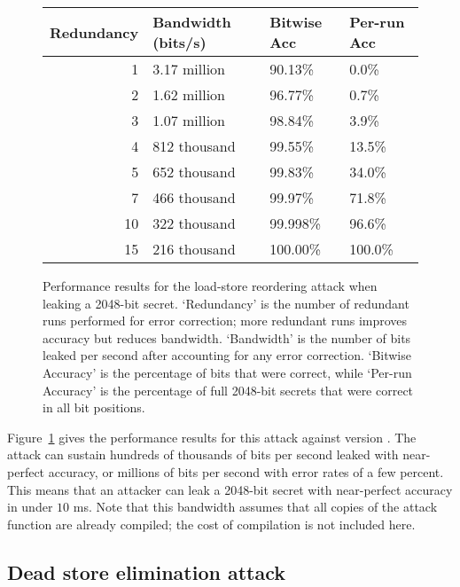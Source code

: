 \begin{figure}
  \small
  \begin{tabular}{ r | l | l | l }
    Redundancy & Bandwidth (bits/s) & Bitwise Acc & Per-run Acc \\ \hline
    1          & 3.17 million       & 90.13\%     & 0.0\%       \\
    2          & 1.62 million       & 96.77\%     & 0.7\%       \\
    3          & 1.07 million       & 98.84\%     & 3.9\%       \\
    4          & 812 thousand       & 99.55\%     & 13.5\%      \\
    5          & 652 thousand       & 99.83\%     & 34.0\%      \\
    7          & 466 thousand       & 99.97\%     & 71.8\%      \\
    10         & 322 thousand       & 99.998\%    & 96.6\%      \\
    15         & 216 thousand       & 100.00\%    & 100.0\%     \\
  \end{tabular}
  \caption{
    Performance results for the load-store reordering attack when leaking a
    2048-bit secret.
    `Redundancy' is the number of redundant runs performed for error
    correction; more redundant runs improves accuracy but reduces bandwidth.
    `Bandwidth' is the number of bits leaked per second after accounting for
    any error correction.
    `Bitwise Accuracy' is the percentage of bits that were correct, while
    `Per-run Accuracy' is the percentage of full 2048-bit secrets that were
    correct in all bit positions.
  }
  \label{fig:load-store-perf}
\end{figure}

Figure~\ref{fig:load-store-perf} gives the performance results for this attack
against {\GCC} version .
The attack can sustain hundreds of thousands of bits per second leaked with
near-perfect accuracy, or millions of bits per second with error rates of a
few percent.
This means that an attacker can leak a 2048-bit secret with near-perfect
accuracy in under $10$ ms.
Note that this bandwidth assumes that all copies of the attack function are
already compiled; the cost of compilation is not included here.

\subsection{Dead store elimination attack}
\label{subsec:exp-dse}

